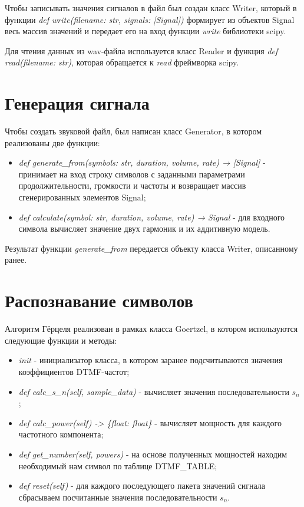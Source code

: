 Чтобы записывать значения сигналов в файл был создан класс Writer, который в функции \textit{def write(filename: str, signals: [Signal])} формирует из объектов Signal весь массив значений и передает его на вход функции \textit{write} библиотеки scipy.

Для чтения данных из wav-файла используется класс Reader и функция \textit{def read(filename: str)}, которая обращается к \textit{read} фреймворка scipy.

\section{Генерация сигнала}

Чтобы создать звуковой файл, был написан класс Generator, в котором реализованы две функции:

\begin{itemize}
	\item \textit{def generate\_from(symbols: str, duration, volume, rate) → [Signal]} - принимает на вход строку символов с заданными параметрами продолжительности, громкости и частоты и возвращает массив сгенерированных элементов Signal;
	\item \textit{def calculate(symbol: str, duration, volume, rate) → Signal} - для входного символа вычисляет значение двух гармоник и их аддитивную модель.
\end{itemize}

Результат функции \textit{generate\_from} передается объекту класса Writer, описанному ранее.

\section{Распознавание символов}

Алгоритм Гёрцеля реализован в рамках класса Goertzel, в котором используются следующие функции и методы:

\begin{itemize}
	\item \textit{init} - инициализатор класса, в котором заранее подсчитываются значения коэффициентов DTMF-частот;
	\item \textit{def calc\_s\_n(self, sample\_data)} - вычисляет значения последовательности $s_n$;
	\item \textit{def calc\_power(self) -> \{float: float\}} - вычисляет мощность для каждого частотного компонента;
	\item \textit{def get\_number(self, powers)} - на основе полученных мощностей находим необходимый нам символ по таблице DTMF\_TABLE;
	\item \textit{def reset(self)} - для каждого последующего пакета значений сигнала сбрасываем посчитанные значения последовательности $s_n$.
\end{itemize}

